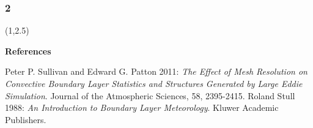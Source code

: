 \documentclass{beamer}
\newcommand\FrameText[1]{
\begin{textblock}{16}(1,2.5)
\raggedright #1
\end{textblock}}
\begin{document}
\begin{frame}
\frametitle{2}
\FrameText{\bf{\large References}}
\begin{thebibliography}{99}
 Peter P. Sullivan and Edward G. Patton 2011: \emph{The Effect of Mesh Resolution on Convective Boundary Layer Statistics and Structures Generated by Large Eddie Simulation}. Journal of the Atmospheric Sciences, 58, 2395-2415.
 Roland Stull 1988: \emph{An Introduction to Boundary Layer Meteorology}. Kluwer Academic Publishers.

\end{thebibliography}
\end{frame}
\end{document}
